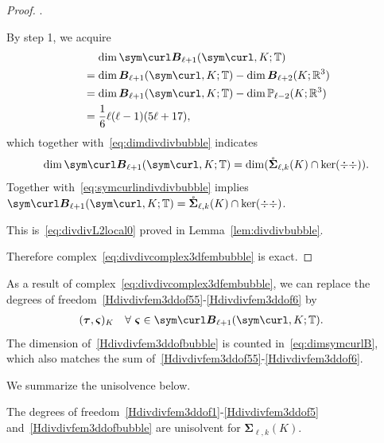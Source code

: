 \begin{proof}
\medskip
{}. 

By step 1, we acquire
\begin{align}
&\quad\,\dim\sym\curl\boldsymbol B_{\ell+1}(\sym\curl, K;\mathbb T) \notag \\
&=\dim\boldsymbol B_{\ell+1}(\sym\curl, K;\mathbb T)-\dim\boldsymbol B_{\ell+2}(K;\mathbb R^3) \notag  \\
&=\dim\boldsymbol B_{\ell+1}(\sym\curl, K;\mathbb T)-\dim\mathbb P_{\ell-2}(K;\mathbb R^3) \notag \\
&=\frac{1}{6}\ell(\ell-1)(5\ell+17) \label{eq:dimsymcurlB},
\end{align}
which together with~\eqref{eq:dimdivdivbubble} indicates
$$
\dim\sym\curl\boldsymbol B_{\ell+1}(\sym\curl, K;\mathbb T)=\dim(\mathring{\boldsymbol \Sigma}_{\ell,k}(K)\cap\ker(\div\div)).$$ 
Together with~\eqref{eq:symcurlindivdivbubble} implies $\sym\curl\boldsymbol B_{\ell+1}(\sym\curl, K;\mathbb T)=\mathring{\boldsymbol \Sigma}_{\ell,k}(K)\cap\ker(\div\div)$.

\medskip
{}  This is~\eqref{eq:divdivL2local0} proved in Lemma~\ref{lem:divdivbubble}.

\medskip

Therefore complex~\eqref{eq:divdivcomplex3dfembubble} is exact.
\end{proof}

As a result of complex~\eqref{eq:divdivcomplex3dfembubble}, we can replace the degrees of freedom~\eqref{Hdivdivfem3ddof55}-\eqref{Hdivdivfem3ddof6} by
\begin{align}\label{Hdivdivfem3ddofbubble}
(\boldsymbol \tau, \boldsymbol \varsigma)_K & \quad\forall~\boldsymbol \varsigma\in\sym\curl\boldsymbol B_{\ell+1}(\sym\curl, K;\mathbb T).
\end{align}
The dimension of~\eqref{Hdivdivfem3ddofbubble} is counted in~\eqref{eq:dimsymcurlB}, which also matches the sum of~\eqref{Hdivdivfem3ddof55}-\eqref{Hdivdivfem3ddof6}. 

We summarize the unisolvence below.

\begin{corollary}\label{cor:unisovlenHdivdivfem2}
The degrees of freedom~\eqref{Hdivdivfem3ddof1}-\eqref{Hdivdivfem3ddof5} and~\eqref{Hdivdivfem3ddofbubble} are unisolvent for $\boldsymbol \Sigma_{\ell,k}(K)$.
\end{corollary}

